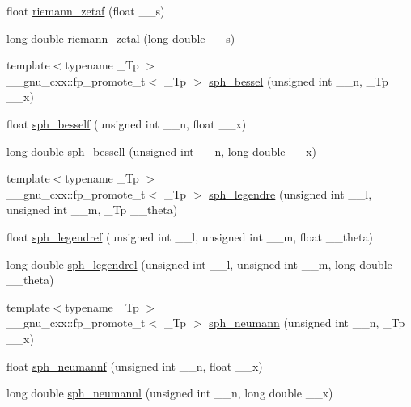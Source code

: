 \begin{DoxyCompactItemize}
\item 
float \hyperlink{group__cxx17__math__spec__func_gaf92063315061a56d3e2c4053156d968e}{riemann\+\_\+zetaf} (float \+\_\+\+\_\+s)
\item 
long double \hyperlink{group__cxx17__math__spec__func_ga1e92da3b878d75270f38d3ec9b513086}{riemann\+\_\+zetal} (long double \+\_\+\+\_\+s)
\item 
{\footnotesize template$<$typename \+\_\+\+Tp $>$ }\\\+\_\+\+\_\+gnu\+\_\+cxx\+::fp\+\_\+promote\+\_\+t$<$ \+\_\+\+Tp $>$ \hyperlink{group__cxx17__math__spec__func_gad125841d7c85e461cb8954952e3a17c8}{sph\+\_\+bessel} (unsigned int \+\_\+\+\_\+n, \+\_\+\+Tp \+\_\+\+\_\+x)
\item 
float \hyperlink{group__cxx17__math__spec__func_ga534e36e1dcefad8daec98920db16eec4}{sph\+\_\+besself} (unsigned int \+\_\+\+\_\+n, float \+\_\+\+\_\+x)
\item 
long double \hyperlink{group__cxx17__math__spec__func_ga11d72b1af81ce9da3c878a25087ee927}{sph\+\_\+bessell} (unsigned int \+\_\+\+\_\+n, long double \+\_\+\+\_\+x)
\item 
{\footnotesize template$<$typename \+\_\+\+Tp $>$ }\\\+\_\+\+\_\+gnu\+\_\+cxx\+::fp\+\_\+promote\+\_\+t$<$ \+\_\+\+Tp $>$ \hyperlink{group__cxx17__math__spec__func_gacef0d41a7ce572a9ace3437498794ed0}{sph\+\_\+legendre} (unsigned int \+\_\+\+\_\+l, unsigned int \+\_\+\+\_\+m, \+\_\+\+Tp \+\_\+\+\_\+theta)
\item 
float \hyperlink{group__cxx17__math__spec__func_gaae635d28c06a3be2679901b382090852}{sph\+\_\+legendref} (unsigned int \+\_\+\+\_\+l, unsigned int \+\_\+\+\_\+m, float \+\_\+\+\_\+theta)
\item 
long double \hyperlink{group__cxx17__math__spec__func_ga2f6618dea1847f09fd67f3c974c1910d}{sph\+\_\+legendrel} (unsigned int \+\_\+\+\_\+l, unsigned int \+\_\+\+\_\+m, long double \+\_\+\+\_\+theta)
\item 
{\footnotesize template$<$typename \+\_\+\+Tp $>$ }\\\+\_\+\+\_\+gnu\+\_\+cxx\+::fp\+\_\+promote\+\_\+t$<$ \+\_\+\+Tp $>$ \hyperlink{group__cxx17__math__spec__func_ga01cdd716aaca8ff3c08f307800fd5220}{sph\+\_\+neumann} (unsigned int \+\_\+\+\_\+n, \+\_\+\+Tp \+\_\+\+\_\+x)
\item 
float \hyperlink{group__cxx17__math__spec__func_ga789143122fa99536329bc2d1b1aac2f0}{sph\+\_\+neumannf} (unsigned int \+\_\+\+\_\+n, float \+\_\+\+\_\+x)
\item 
long double \hyperlink{group__cxx17__math__spec__func_ga3cededa9b6e4601f190c3811e6aabfd6}{sph\+\_\+neumannl} (unsigned int \+\_\+\+\_\+n, long double \+\_\+\+\_\+x)
\end{DoxyCompactItemize}
